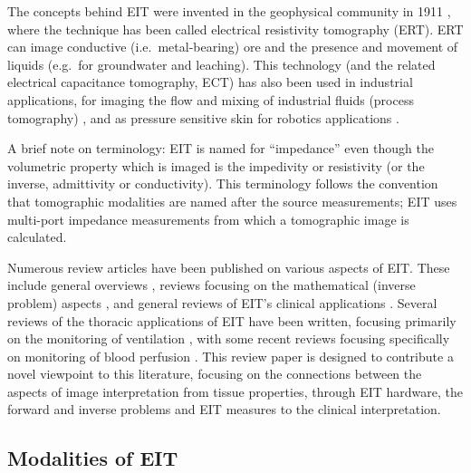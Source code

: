 \documentclass[12pt]{article} \usepackage[margin=3cm]{geometry} \usepackage[margin=20pt,font=small,labelfont=bf]{caption}\def\TBLWIDA{35mm}\def\TBLWIDB{95mm}
\newcommand{\TODO}[1]{{\bf TODO: #1}}
\begin{document}
The concepts behind EIT were invented in the 
geophysical community in 1911 \cite{Allaud1977}, where
the technique has been called electrical resistivity
tomography (ERT). ERT can
image conductive (i.e.\ metal-bearing) ore
and the presence and movement of liquids
(e.g.\ for groundwater and leaching).
This technology (and the related electrical capacitance
tomography, ECT) has also been used in industrial
applications, 
 for imaging the flow and mixing of industrial fluids
(process tomography) \cite{Beck1996Process},
and as pressure sensitive skin for robotics applications
\cite{Silvera2015Skin}.

A brief note on terminology: EIT is named for
``impedance'' even though the volumetric property which is
imaged is the impedivity or resistivity (or the inverse,
              admittivity or conductivity)\cite{Bayford2006Bioimpendace}.
This terminology follows the convention that 
tomographic modalities are named after the source measurements;
EIT uses multi-port impedance measurements
from which a tomographic image is calculated.

Numerous review articles have been published on various
aspects of EIT. These include general overviews
\cite{Brown2003EIT, Holder2004Book, Cheney1999EIT},
reviews focusing on the mathematical (inverse problem) aspects
\cite{Adler2016Handbook, Borcea2002EIT, Uhlmann2009EIT}, 
and general reviews of EIT's clinical applications
\cite{Dijkstra1993EIT}.
Several reviews of the thoracic applications of EIT have
been written, focusing primarily on the monitoring of
ventilation
\cite{Adler2012Whither,
      Bodenstein2009EIT,
      Costa2009EIT,
      Frerichs2017Chest,
      Frerichs2014EIT,
      Frerichs2000EIT,
      Lundin2012EIT,
      Riedel2010EIT},
with some recent reviews focusing specifically on 
monitoring of blood perfusion
\cite{Leonhardt2012EIT, Nguyen2012Perfusion}.
This review paper is designed to contribute a novel viewpoint
to this literature, focusing on the connections between 
the aspects of image interpretation from tissue
properties, through EIT hardware, the forward and inverse problems
and EIT measures to the clinical interpretation.

\subsection{Modalities of EIT}
\end{document}
